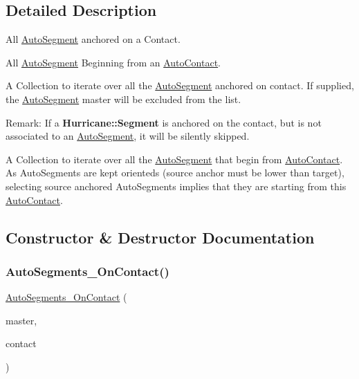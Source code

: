 \subsection{Detailed Description}
All \hyperlink{classKatabatic_1_1AutoSegment}{Auto\+Segment} anchored on a Contact. 

All \hyperlink{classKatabatic_1_1AutoSegment}{Auto\+Segment} Beginning from an \hyperlink{classKatabatic_1_1AutoContact}{Auto\+Contact}.

A Collection to iterate over all the \hyperlink{classKatabatic_1_1AutoSegment}{Auto\+Segment} anchored on {\ttfamily contact}. If supplied, the \hyperlink{classKatabatic_1_1AutoSegment}{Auto\+Segment} {\ttfamily master} will be excluded from the list.

\begin{DoxyParagraph}{Remark\+:}
If a \textbf{ Hurricane\+::\+Segment} is anchored on the {\ttfamily contact}, but is not associated to an \hyperlink{classKatabatic_1_1AutoSegment}{Auto\+Segment}, it will be silently skipped.
\end{DoxyParagraph}
A Collection to iterate over all the \hyperlink{classKatabatic_1_1AutoSegment}{Auto\+Segment} that begin from \hyperlink{classKatabatic_1_1AutoContact}{Auto\+Contact}. As Auto\+Segments are kept orienteds (source anchor must be lower than target), selecting source anchored Auto\+Segments implies that they are starting from this \hyperlink{classKatabatic_1_1AutoContact}{Auto\+Contact}. 

\subsection{Constructor \& Destructor Documentation}
\mbox{\label{classKatabatic_1_1AutoSegments__OnContact_af3f727d0c0fe394da508f52a6c9e4b90}} 
\subsubsection{\texorpdfstring{Auto\+Segments\+\_\+\+On\+Contact()}{AutoSegments\_OnContact()}\hspace{0.1cm}{\footnotesize\ttfamily [1/2]}}
{\footnotesize\ttfamily \hyperlink{classKatabatic_1_1AutoSegments__OnContact}{Auto\+Segments\+\_\+\+On\+Contact} (\begin{DoxyParamCaption}\item[{\hyperlink{classKatabatic_1_1AutoSegment}{Auto\+Segment} $\ast$}]{master,  }\item[{\textbf{ Contact} $\ast$}]{contact }\end{DoxyParamCaption})\hspace{0.3cm}{\ttfamily [inline]}}


